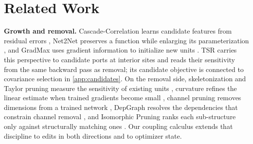 \documentclass[10pt]{article}
\theoremstyle{paper}
\begin{document}
\section{Related Work}
\label{sec:related}
\textbf{Growth and removal.} Cascade-Correlation learns candidate features from residual errors \citep{fahlman1989cascade}, Net2Net preserves a function while enlarging its parameterization \citep{Chen2016}, and GradMax uses gradient information to initialize new units \citep{evci2022gradmax}. TSR carries this perspective to candidate ports at interior sites and reads their sensitivity from the same backward pass as removal; its candidate objective is connected to covariance selection in \cref{app:candidates}. On the removal side, skeletonization and Taylor pruning measure the sensitivity of existing units \citep{mozer1988skeletonization,molchanov2017pruning}, curvature refines the linear estimate when trained gradients become small \citep{lecun1989optimal,hassibi1992second}, channel pruning removes dimensions from a trained network \citep{han2015learning,li2016pruning,he2017channel,liu2017learning}, DepGraph resolves the dependencies that constrain channel removal \citep{10204583}, and Isomorphic Pruning ranks each sub-structure only against structurally matching ones \citep{fang2024isomorphic}. Our coupling calculus extends that discipline to edits in both directions and to optimizer state.
\end{document}
